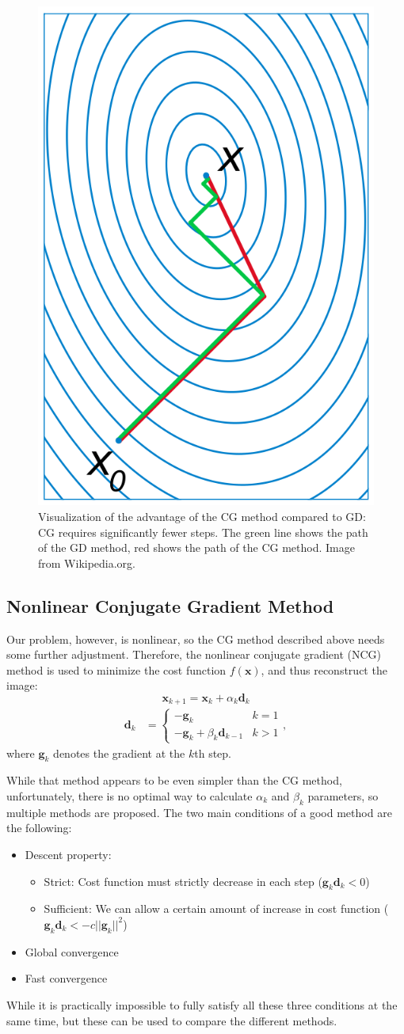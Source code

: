 \begin{figure}
    \centering
    \includegraphics[width=0.3\linewidth]{images/project with Wiem/Conjugate_gradient_illustration.png}
    \caption{Visualization of the advantage of the CG method compared to GD: CG requires significantly fewer steps. The green line shows the path of the GD method, red shows the path of the CG method. Image from Wikipedia.org.}
    \label{fig:CG_vs_GD}
\end{figure}

\subsection{Nonlinear Conjugate Gradient Method}
Our problem, however, is nonlinear, so the CG method described above needs some further adjustment. Therefore, the nonlinear conjugate gradient (NCG) method is used to minimize the cost function $f(\mathbf{x})$, and thus reconstruct the image:
$$\mathbf{x}_{k+1} = \mathbf{x}_k + \alpha_k \mathbf{d}_k$$
\begin{align*}
    \mathbf{d}_k &=
    \begin{cases}
    -\mathbf{g}_k & k = 1 \\
    -\mathbf{g}_k + \beta_k \mathbf{d}_{k-1} & k > 1
    \end{cases},
\end{align*}
where $\mathbf{g}_k$ denotes the gradient at the $k$th step.

While that method appears to be even simpler than the CG method, unfortunately, there is no optimal way to calculate $\alpha_k$ and $\beta_k$ parameters, so multiple methods are proposed. The two main conditions of a good method are the following:
\begin{itemize}
    \item Descent property:
    \begin{itemize}
        \item Strict: Cost function must strictly decrease in each step ($\mathbf{g}_k \mathbf{d}_k < 0$)
        \item Sufficient: We can allow a certain amount of increase in cost function ($\mathbf{g}_k \mathbf{d}_k < -c ||\mathbf{g}_k||^2$)
    \end{itemize}
    \item Global convergence
    \item Fast convergence
\end{itemize}
While it is practically impossible to fully satisfy all these three conditions at the same time, but these can be used to compare the different methods.

